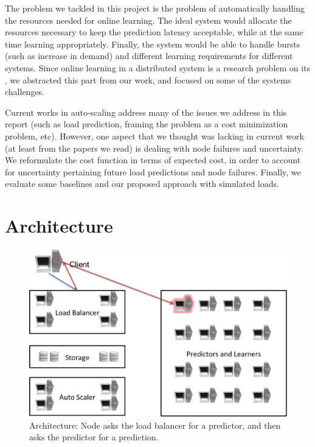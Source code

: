 \documentclass[12pt]{article}
\begin{document}
The problem we tackled in this project is the problem of automatically
handling the resources needed for online learning. The ideal system would
allocate the resources necessary to keep the prediction latency acceptable,
while at the same time learning appropriately. Finally, the system would be able
to handle bursts (such as increase in demand) and different learning
requirements for different systems. Since online learning in a distributed
system is a research problem on its \cite{pserver1, pserver2}, we abstracted
this part from our work, and focused on some of the systems challenges.

Current works in auto-scaling\cite{Mao:2011:AMC:2063384.2063449,6008748} address
many of the issues we address in this report (such as load prediction, framing
the problem as a cost minimization problem, etc). However, one aspect that we
thought was lacking in current work (at least from the papers we read) is
dealing with node failures and uncertainty. We reformulate the cost function in
terms of expected cost, in order to account for uncertainty pertaining future
load predictions and node failures. Finally, we evaluate some baselines and our
proposed approach with simulated loads.

\section{Architecture}
\begin{figure}[h!]
\center
\includegraphics[width=1.0\textwidth]{architecture.png}
\caption{Architecture: Node asks the load balancer for a predictor, and then
asks the predictor for a prediction.}
\label{architecture}
\end{figure}
\end{document}
